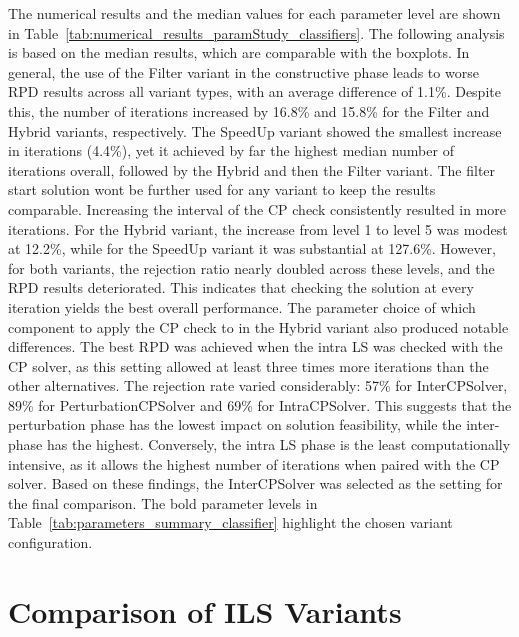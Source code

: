 The numerical results and the median values for each parameter level are shown in Table~\ref{tab:numerical_results_paramStudy_classifiers}.
The following analysis is based on the median results, which are comparable with the boxplots.
In general, the use of the Filter variant in the constructive phase leads to worse \gls{RPD} results across all variant types,
with an average difference of 1.1\%. Despite this, the number of iterations increased by 16.8\% and 15.8\% for the Filter and Hybrid variants,
respectively. The SpeedUp variant showed the smallest increase in iterations (4.4\%), yet it achieved by far the highest median
number of iterations overall, followed by the Hybrid and then the Filter variant. The filter start solution wont be further used for any variant to
keep the results comparable. Increasing the interval of the \gls{CP} check consistently resulted in more iterations. For the Hybrid variant,
the increase from level 1 to level 5 was modest at 12.2\%, while for the SpeedUp variant it was substantial at 127.6\%. However, for both
variants, the rejection ratio nearly doubled across these levels, and the \gls{RPD} results deteriorated. This indicates that checking the solution
at every iteration yields the best overall performance. The parameter choice of which component to apply the \gls{CP} check to in the Hybrid variant also produced notable differences.
The best \gls{RPD} was achieved when the intra \gls{LS} was checked with the \gls{CP} solver, as this setting allowed at least three times more
iterations than the other alternatives. The rejection rate varied considerably: 57\% for InterCPSolver, 89\% for PerturbationCPSolver
and 69\% for IntraCPSolver. This suggests that the perturbation phase has the lowest impact on solution feasibility, while the inter-phase
has the highest. Conversely, the intra \gls{LS} phase is the least computationally intensive, as it allows the highest number of iterations
when paired with the \gls{CP} solver. Based on these findings, the InterCPSolver was selected as the setting for the final comparison.
The bold parameter levels in Table~\ref{tab:parameters_summary_classifier} highlight the chosen variant configuration.

\section{Comparison of ILS Variants}
\label{sec:comparison_ils_variants}

